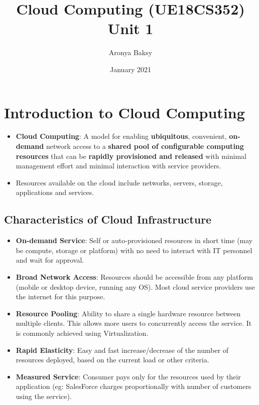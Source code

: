 \documentclass{article}
\title{Cloud Computing (UE18CS352) \\
    Unit 1}
\author{Aronya Baksy}
\date{January 2021}
\begin{document}
\maketitle

\section{Introduction to Cloud Computing}
\begin{itemize}
    \item \textbf{Cloud Computing}: A model for enabling \textbf{ubiquitous}, convenient, \textbf{on-demand} network access to a\textbf{ shared pool of configurable computing resources} that can be \textbf{rapidly provisioned and released} with minimal management effort and minimal interaction with service providers. 
    
    \item Resources available on the cloud include networks, servers, storage, applications and services. 
\end{itemize}

\subsection{Characteristics of Cloud Infrastructure}
\begin{itemize}
    \item \textbf{On-demand Service}: Self or auto-provisioned resources in short time (may be compute, storage or platform) with no need to interact with IT personnel and wait for approval.
    
    \item \textbf{Broad Network Access}: Resources should be accessible from any platform (mobile or desktop device, running any OS). Most cloud service providers use the internet for this purpose. 
    
    \item \textbf{Resource Pooling}: Ability to share a single hardware resource between multiple clients. This allows more users to concurrently access the service. It is commonly achieved using Virtualization. 
    
    \item \textbf{Rapid Elasticity}: Easy and fast increase/decrease of the number of resources deployed,  based on the current load or other criteria. 
    
    \item \textbf{Measured Service}: Consumer pays only for the resources used by their application (eg: SalesForce charges proportionally with number of customers using the service). 
\end{itemize}
\end{document}
